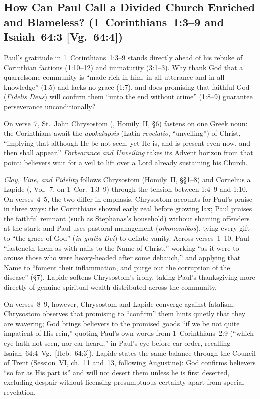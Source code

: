 \subsection{How Can Paul Call a Divided Church Enriched and Blameless? (1~Corinthians~1:3--9 and Isaiah~64:3 [Vg.~64:4])}

Paul's gratitude in 1~Corinthians~1:3--9 stands directly ahead of his rebuke of Corinthian factions (1:10--12) and immaturity (3:1--3). Why thank God that a quarrelsome community is ``made rich in him, in all utterance and in all knowledge'' (1:5) and lacks no grace (1:7), and does promising that faithful God (\emph{Fidelis Deus}) will confirm them ``unto the end without crime'' (1:8--9) guarantee perseverance unconditionally?

On verse~7, St.~John Chrysostom (, Homily~II, §6) fastens on one Greek noun: the Corinthians await the \emph{apokalupsis} (Latin \emph{revelatio}, ``unveiling'') of Christ, ``implying that although He be not seen, yet He is, and is present even now, and then shall appear.'' \emph{Forbearance and Unveiling} takes its Advent horizon from that point: believers wait for a veil to lift over a Lord already sustaining his Church.

\emph{Clay, Vine, and Fidelity} follows Chrysostom (Homily~II, §§1--8) and Cornelius a Lapide (, Vol.~7, on 1~Cor.~1:3--9) through the tension between 1:4--9 and 1:10. On verses~4--5, the two differ in emphasis. Chrysostom accounts for Paul's praise in three ways: the Corinthians showed early zeal before growing lax; Paul praises the faithful remnant (such as Stephanas's household) without shaming offenders at the start; and Paul uses pastoral management (\emph{oikonomikos}), tying every gift to ``the grace of God'' (\emph{in gratia Dei}) to deflate vanity. Across verses~1--10, Paul ``fasteneth them as with nails to the Name of Christ,'' working ``as it were to arouse those who were heavy-headed after some debauch,'' and applying that Name to ``foment their inflammation, and purge out the corruption of the disease'' (§7). Lapide softens Chrysostom's irony, taking Paul's thanksgiving more directly of genuine spiritual wealth distributed across the community.

On verses~8--9, however, Chrysostom and Lapide converge against fatalism. Chrysostom observes that promising to ``confirm'' them hints quietly that they are wavering; God brings believers to the promised goods ``if we be not quite impatient of His rein,'' quoting Paul's own words from 1~Corinthians~2:9 (``which eye hath not seen, nor ear heard,'' in Paul's eye-before-ear order, recalling Isaiah~64:4~Vg.\ [Heb.~64:3]). Lapide states the same balance through the Council of Trent (Session~VI, ch.~11 and~13, following Augustine): God confirms believers ``so far as His part is'' and will not desert them unless he is first deserted, excluding despair without licensing presumptuous certainty apart from special revelation.

